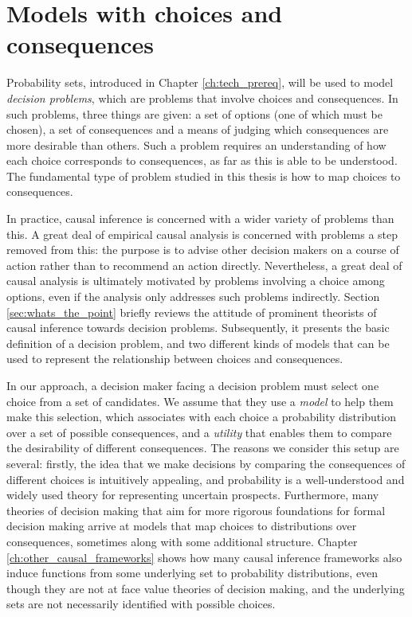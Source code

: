 

\chapter{Models with choices and consequences}\label{ch:2p_statmodels}

Probability sets, introduced in Chapter \ref{ch:tech_prereq}, will be used to model \emph{decision problems}, which are problems that involve choices and consequences. In such problems, three things are given: a set of options (one of which must be chosen), a set of consequences and a means of judging which consequences are more desirable than others. Such a problem requires an understanding of how each choice corresponds to consequences, as far as this is able to be understood. The fundamental type of problem studied in this thesis is how to map choices to consequences. 

In practice, causal inference is concerned with a wider variety of problems than this. A great deal of empirical causal analysis is concerned with problems a step removed from this: the purpose is to advise other decision makers on a course of action rather than to recommend an action directly. Nevertheless, a great deal of causal analysis is ultimately motivated by problems involving a choice among options, even if the analysis only addresses such problems indirectly. Section \ref{sec:whats_the_point} briefly reviews the attitude of prominent theorists of causal inference towards decision problems. Subsequently, it presents the basic definition of a decision problem, and two different kinds of models that can be used to represent the relationship between choices and consequences.

In our approach, a decision maker facing a decision problem must select one choice from a set of candidates. We assume that they use a \emph{model} to help them make this selection, which associates with each choice a probability distribution over a set of possible consequences, and a \emph{utility} that enables them to compare the desirability of different consequences. The reasons we consider this setup are several: firstly, the idea that we make decisions by comparing the consequences of different choices is intuitively appealing, and probability is a well-understood and widely used theory for representing uncertain prospects. Furthermore, many theories of decision making that aim for more rigorous foundations for formal decision making arrive at models that map choices to distributions over consequences, sometimes along with some additional structure. Chapter \ref{ch:other_causal_frameworks} shows how many causal inference frameworks also induce functions from some underlying set to probability distributions, even though they are not at face value theories of decision making, and the underlying sets are not necessarily identified with possible choices. 

